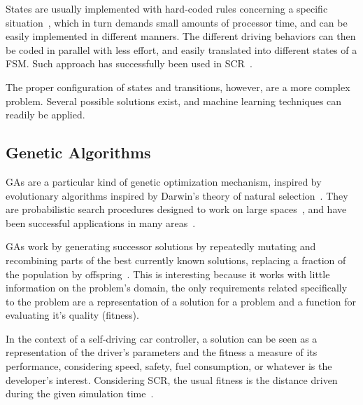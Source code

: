 States are usually implemented with hard-coded rules concerning a specific situation~\cite{Buckland:2005:AI}, which in turn demands small amounts of processor time, and can be easily implemented in different manners. The different driving behaviors can then be coded in parallel with less effort, and easily translated into different states of a FSM. Such approach has successfully been used in SCR~\cite{2009,DIEGO}.

The proper configuration of states and transitions, however, are a more complex problem. Several possible solutions exist, and machine learning techniques can readily be applied.

\subsection{Genetic Algorithms}

GAs are a particular kind of genetic optimization mechanism, inspired by evolutionary algorithms inspired by Darwin's theory of natural selection~\cite{GA}. They are probabilistic search procedures designed to work on large spaces~\cite{goldberg1988}, and have been successful applications in many areas~\cite{GABIO,GAECO,stanley_real-time_2005,pedrycz_genetic_2005}.

GAs work by generating successor solutions by repeatedly mutating and recombining parts of the best currently known solutions, replacing a fraction of the population by offspring~\cite{mitchell_1997}. This is interesting because it works with little information on the problem's domain, the only requirements related specifically to the problem are a representation of a solution for a problem and a function for evaluating it's quality (fitness).

In the context of a self-driving car controller, a solution can be seen as a representation of the driver's parameters and the fitness a measure of its performance, considering speed, safety, fuel consumption, or whatever is the developer's interest. Considering SCR, the usual fitness is the distance driven during the given simulation time~\cite{2009}.
